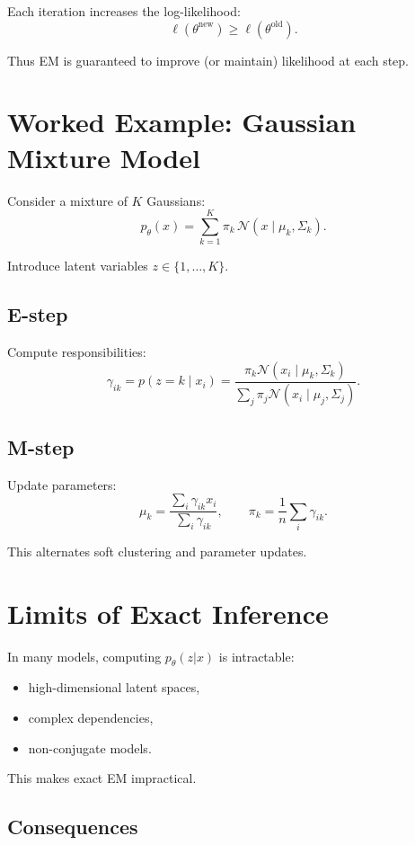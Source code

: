 Each iteration increases the log-likelihood:
\[
\ell(\theta^{\text{new}}) \ge \ell(\theta^{\text{old}}).
\]

Thus EM is guaranteed to improve (or maintain) likelihood at each step.

\section{Worked Example: Gaussian Mixture Model}

Consider a mixture of $K$ Gaussians:
\[
p_\theta(x) = \sum_{k=1}^K \pi_k \, \mathcal{N}(x \mid \mu_k, \Sigma_k).
\]

Introduce latent variables $z \in \{1,\dots,K\}$.

\subsection{E-step}

Compute responsibilities:
\[
\gamma_{ik}
=
p(z=k \mid x_i)
=
\frac{\pi_k \mathcal{N}(x_i \mid \mu_k, \Sigma_k)}
{\sum_j \pi_j \mathcal{N}(x_i \mid \mu_j, \Sigma_j)}.
\]

\subsection{M-step}

Update parameters:
\[
\mu_k = \frac{\sum_i \gamma_{ik} x_i}{\sum_i \gamma_{ik}},
\qquad
\pi_k = \frac{1}{n} \sum_i \gamma_{ik}.
\]

This alternates soft clustering and parameter updates.

\section{Limits of Exact Inference}

In many models, computing $p_\theta(z|x)$ is intractable:
\begin{itemize}
    \item high-dimensional latent spaces,
    \item complex dependencies,
    \item non-conjugate models.
\end{itemize}

This makes exact EM impractical.

\subsection{Consequences}

